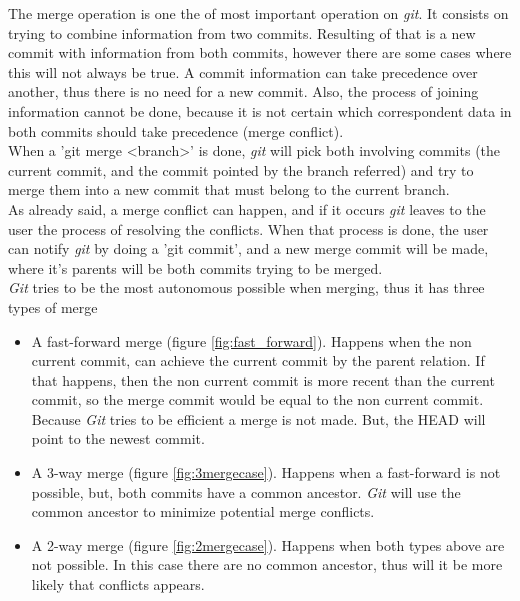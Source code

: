 The merge operation is one the of most important operation on \emph{git}. It
consists on trying to combine information from two commits. Resulting of that
is a new commit with information from both commits, however there are some cases
where this will not always be true. A commit information can take precedence
over another, thus there is no need for a new commit. Also, the process of
joining information cannot be done, because it is not certain which
correspondent data in both commits should take precedence (merge conflict).\\

When a 'git merge <branch>' is done, \emph{git} will pick both involving
commits (the current commit, and the commit pointed by the branch referred)
and try to merge them into a new commit that must belong to the current branch.
\\
As already said, a merge conflict can happen, and if it occurs \emph{git} leaves
to the user the process of resolving the conflicts. When that process is done,
the user can notify \emph{git} by doing a 'git commit', and a new merge commit 
will be made, where it's parents will be both commits trying to be merged. \\
\emph{Git} tries to be the most autonomous possible when merging, thus it has
three types of merge

\begin{itemize}
\item A fast-forward merge (figure \ref{fig:fast_forward}). 
Happens when the non current commit, can achieve the current commit by the 
parent relation. If that happens, then the non current commit is more recent
than the current commit, so the merge commit would be equal to the non current
commit. Because \emph{Git} tries to be efficient a merge is not made. But, the
HEAD will point to the newest commit. 

\item A 3-way merge (figure \ref{fig:3mergecase}). 
Happens when a fast-forward is not possible, but, both commits have a common
ancestor. \emph{Git} will use the common ancestor to minimize potential
merge conflicts.

\item A 2-way merge (figure \ref{fig:2mergecase}). 
Happens when both types above are not possible. In this case there are no
common ancestor, thus will it be more likely that conflicts appears.

\end{itemize}

